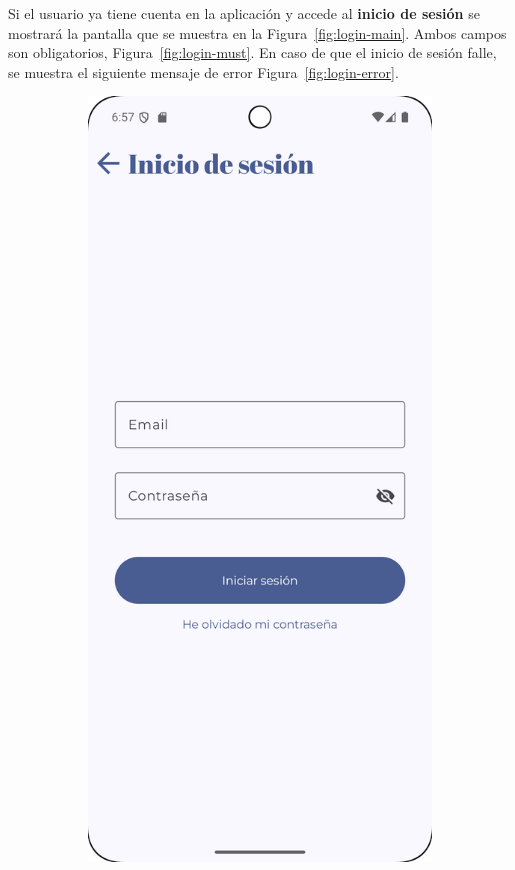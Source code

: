 \clearpage
Si el usuario ya tiene cuenta en la aplicación y accede al \textbf{inicio de sesión} se mostrará la pantalla que se muestra en la Figura~\ref{fig:login-main}. Ambos campos son obligatorios, Figura~\ref{fig:login-must}. En caso de que el inicio de sesión falle, se muestra el siguiente mensaje de error Figura~\ref{fig:login-error}.

\begin{figure}[H]
    \centering

    \begin{subfigure}[b]{0.3\textwidth}
      \includegraphics[width=\textwidth]{./img/manual/pinche_login.png}

\end{subfigure}
\end{figure}
